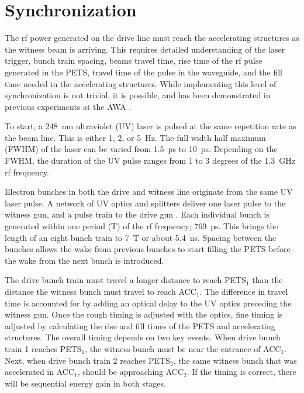 \documentclass[letterpaper,  %
              ]{jacow-2_3}   %
\begin{document}
\section{Synchronization}
The rf power generated on the drive line
must reach the accelerating structures as the witness beam is arriving.
This requires detailed understanding of the laser trigger, 
bunch train spacing, beams travel time, 
rise time of the rf pulse generated in the PETS, 
travel time of the pulse in the waveguide, and 
the fill time needed in the accelerating structures. 
While implementing this level of synchronization is not trivial, 
it is possible, and has been demonstrated in previous experiments
at the AWA \cite{tba}. 


To start, a \SI{248}{nm} ultraviolet (UV) laser is pulsed at 
the same repetition rate as the beam line. This is either 1, 2, or \SI{5}{Hz}.
The full width half maximum (FWHM) of the laser can be varied from \SI{1.5}{ps}
to \SI{10}{ps}. Depending on the FWHM, the duration of the UV 
pulse ranges from 1 to 3 degrees of the \SI{1.3}{GHz} rf frequency. 
 
Electron bunches in both the drive and witness line 
originate from the same UV laser pulse. 
A  network of UV optics and splitters 
deliver one laser pulse to the witness gun, and a pulse train to the drive gun \cite{korea}.
Each individual bunch is generated within one period (T) of the rf frequency; \SI{769}{ps}.
This brings the length of an eight bunch train to 7~T or about \SI{5.4}{ns}.
Spacing between the bunches allows the wake from previous bunches to 
start filling the PETS before the wake from the next bunch is introduced.

The drive bunch train must travel a longer distance to reach PETS$_1$ 
than the distance the witness bunch must travel to reach ACC$_1$.
The difference in travel time is accounted for by adding an optical delay 
to the UV optics preceding the witness gun. 
Once the rough timing is adjusted with the optics, fine timing is adjusted
by calculating the rise and fill times of the PETS and accelerating structures. 
The overall timing depends on two key events. When drive bunch train 1 reaches PETS$_1$, 
the witness bunch must be near the entrance of ACC$_1$. Next, when 
drive bunch train 2 reaches PETS$_2$, the same witness bunch that was accelerated
in ACC$_1$, should be approaching ACC$_2$. If the timing is correct, 
there will be sequential energy gain in both stages.
\end{document}
